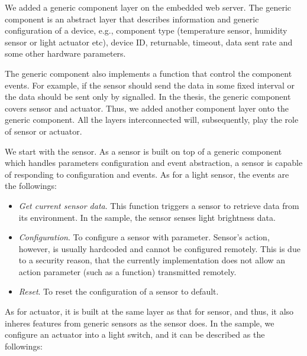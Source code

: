 We added a generic component layer on the embedded web server. The generic component is an abstract layer that describes information and generic configuration of a device, e.g., component type (temperature sensor, humidity sensor or light actuator etc), device ID, returnable, timeout, data sent rate and some other hardware parameters. 

The generic component also implements a function that control the component events. For example, if the sensor should send the data in some fixed interval or the data should be sent only by signalled. In the thesis, the generic component covers sensor and actuator. Thus, we added another component layer onto the generic component. All the layers interconnected will, subsequently, play the role of sensor or actuator.

We start with the sensor. As a sensor is built on top of a generic component which handles parameters configuration and event abstraction, a sensor is capable of responding to configuration and events. As for a light sensor, the events are the followings:

\begin{itemize}
\setlength{\itemsep}{0pt}
\item \emph{Get current sensor data}. This function triggers a sensor to retrieve data from its environment. In the sample, the sensor senses light brightness data.
\item \emph{Configuration}. To configure a sensor with parameter. Sensor's action, however, is usually hardcoded and cannot be configured remotely. This is due to a security reason, that the currently implementation does not allow an action parameter (such as a function) transmitted remotely.
\item \emph{Reset}. To reset the configuration of a sensor to default.
\end{itemize}

As for actuator, it is built at the same layer as that for sensor, and thus, it also inheres features from generic sensors as the sensor does. In the sample, we configure an actuator into a light switch, and it can be described as the followings:

